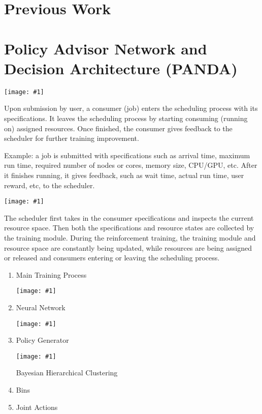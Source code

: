 \documentclass{article}
\theoremstyle{definition}
\theoremstyle{remark}
\newcommand{\addpic}[1]{\texttt{[image: \#1]}}
\begin{document}
	\newpage
	
	\section{Previous Work}
	
	\section{Policy Advisor Network and Decision Architecture (PANDA)}
	

	
	\addpic{figures/Macro-fix.png} 
	
	
	Upon submission by user, a consumer (job) enters the scheduling process with its specifications. It leaves the scheduling process by starting consuming (running on) assigned resources. Once finished, the consumer gives feedback to the scheduler for further training improvement.
	
	Example: a job is submitted with specifications such as arrival time, maximum run time, required number of nodes or cores, memory size, CPU/GPU, etc. After it finishes running, it gives feedback, such as wait time, actual run time, user reward, etc, to the scheduler.
	
	\addpic{figures/Intro-Scheduler.jpg}
	
	The scheduler first takes in the consumer specifications and inspects the current resource space. Then both the specifications and resource states are collected by the training module. During the reinforcement training, the training module and resource space are constantly being updated, while resources are being assigned or released and consumers entering or leaving the scheduling process.
	
	\begin{enumerate}[label=\alph*.]
	
	\item Main Training Process
	
	\addpic{figures/Training-Main-Process.jpg}
	
	\item Neural Network
	
	\addpic{figures/Neural-Network.jpeg}
	
	\item Policy Generator

	\addpic{figures/Policy-Generator.png}		
	
	Bayesian Hierarchical Clustering
	
	\item Bins
	
	\item Joint Actions

	\end{enumerate}
\end{document}
